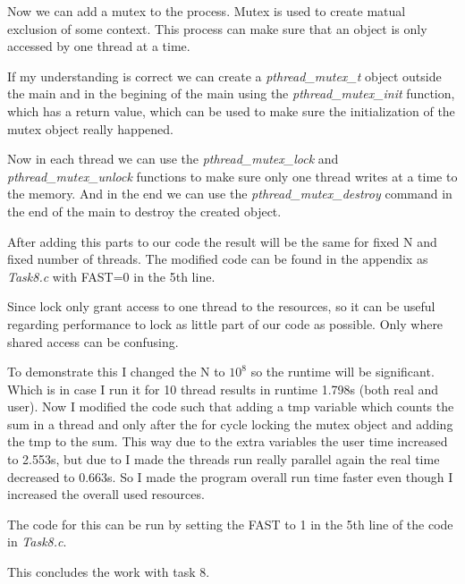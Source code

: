 Now we can add a mutex to the process. Mutex is used to create matual exclusion of some context. This process can make sure that an object is only accessed by one thread at a time. 

If my understanding is correct we can create a \textit{pthread\_mutex\_t} object outside the main and in the begining of the main using the \textit{pthread\_mutex\_init} function, which has a return value, which can be used to make sure the initialization of the mutex object really happened. 

Now in each thread we can use the \textit{pthread\_mutex\_lock} and \textit{pthread\_mutex\_unlock} functions to make sure only one thread writes at a time to the memory. And in the end we can use the \textit{pthread\_mutex\_destroy} command in the end of the main to destroy the created object.

After adding this parts to our code the result will be the same for fixed N and fixed number of threads. The modified code can be found in the appendix as \textit{Task8.c} with FAST=0 in the 5th line.

Since lock only grant access to one thread to the resources, so it can be useful regarding performance to lock as little part of our code as possible. Only where shared access can be confusing. 

To demonstrate this I changed the N to $10^8$ so the runtime will be significant. Which is in case I run it for 10 thread results in runtime 1.798s (both real and user). Now I modified the code such that adding a tmp variable which counts the sum in a thread and only after the for cycle locking the mutex object and adding the tmp to the sum. This way due to the extra variables the user time increased to 2.553s, but due to I made the threads run really parallel again the real time decreased to 0.663s. So I made the program overall run  time faster even though I increased the overall used resources.

The code for this can be run by setting the FAST to 1 in the 5th line of the code in \textit{Task8.c}.

This concludes the work with task 8.
